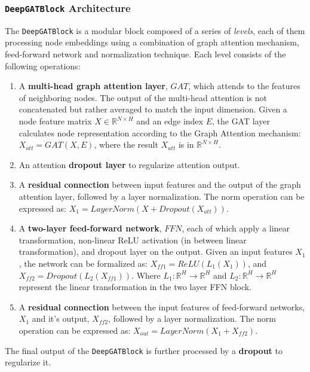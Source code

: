 \documentclass[11pt]{article}
\begin{document}
	\subsubsection{\texttt{DeepGATBlock} Architecture}
	The \texttt{DeepGATBlock} is a modular block composed of a series of \textit{levels}, each of them processing node embeddings using a combination of graph attention mechanism, feed-forward network and normalization technique.
	Each level consists of the following operations:
	\begin{enumerate}
		\item A \textbf{multi-head graph attention layer}, $GAT$, which attends to the features of neighboring nodes.
		The output of the multi-head attention is not concatenated but rather averaged to match the input dimension.
		Given a node feature matrix $X \in \mathbb{R}^{N \times H}$ and an edge index $E$, the GAT layer calculates node representation according to the Graph Attention mechanism: $X_{att} = GAT(X, E)$, where the result $X_{att}$ is in $\mathbb{R}^{N \times H}$.
		
		\item An attention \textbf{dropout layer} to regularize attention output.
		
		\item A \textbf{residual connection} between input features and the output of the graph attention layer, followed by a layer normalization. The norm operation can be expressed as: $X_1 = LayerNorm(X + Dropout(X_{att}))$.
		
		\item A \textbf{two-layer feed-forward network}, $FFN$, each of which apply a linear transformation, non-linear ReLU activation (in between linear transformation), and dropout layer on the output. Given an input features $X_1$, the network can be formalized as: $X_{ff1} =  ReLU(L_1(X_1))$, and $X_{ff2} = Dropout(L_2(X_{ff1}))$. Where $L_1 : \mathbb{R}^{H} \to \mathbb{R}^{H}$ and $L_2 : \mathbb{R}^{H} \to \mathbb{R}^{H}$ represent the linear transformation in the two layer FFN block.
		
		\item A \textbf{residual connection} between the input features of feed-forward networks, $X_1$ and it's output, $X_{ff2}$, followed by a layer normalization. The norm operation can be expressed as: $X_{out} = LayerNorm(X_1 + X_{ff2})$.
	\end{enumerate}
	The final output of the \texttt{DeepGATBlock} is further processed by a \textbf{dropout} to regularize it.
	
\end{document}
